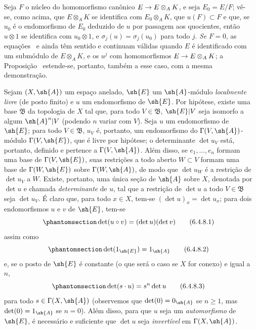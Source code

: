 \documentclass[oneside,10pt]{amsart}
\makeatletter
\renewcommand{\geq}{\geqslant}
\newcommand{\ega@arrow}[2]{\mathchoice{#1}{#2}{#2}{#2}}
\renewcommand{\to}{\ega@arrow{\longrightarrow}{\rightarrow}}
\let\EGAOriginalLabel\label
\renewcommand{\label}[1]{\phantomsection\EGAOriginalLabel{#1}}
\makeatother
\begin{document}
\begin{remark}[6.4.7]
Seja $F$ o núcleo do homomorfismo canônico $E\to E\otimes_A K$, e seja $E_0=E/F$;
vê-se, como acima, que $E\otimes_A K$ se identifica com $E_0\otimes_A K$, que $u(F)\subset F$ e que, se $u_0$ é o endomorfismo de $E_0$ deduzido de $u$ por passagem aos quocientes, então $u\otimes1$ se identifica com $u_0\otimes1$, e $\sigma_j(u)=\sigma_j(u_0)$ para todo $j$.
\emph{Se $F=0$}, as equações~ e  ainda têm sentido e continuam válidas quando $E$ é identificado com um submódulo de $E\otimes_A K$, e os $u^j$ com homomorfismos $E\to E\otimes_A K$;
a Proposição~ estende-se, portanto, também a esse caso, com a mesma demonstração.
\end{remark}

\begin{env}[6.4.8]
\label{II.6.4.8}
Sejam $(X,\sh{A})$ um espaço anelado, $\sh{E}$ um $\sh{A}$-módulo \emph{localmente livre} (de posto finito) e $u$ um endomorfismo de $\sh{E}$.
Por hipótese, existe uma base $\mathfrak{B}$ da topologia de $X$ tal que, para todo $V\in\mathfrak{B}$, $\sh{E}|V$ seja isomorfo a algum $\sh{A}^n|V$ (podendo $n$ variar com $V$).
Seja $u$ um endomorfismo de $\sh{E}$;
para todo $V\in\mathfrak{B}$, $u_V$ é, portanto, um endomorfismo do $\Gamma(V,\sh{A})$-módulo $\Gamma(V,\sh{E})$, que é livre por hipótese;
o determinante $\det u_V$ está, portanto, definido e pertence a $\Gamma(V,\sh{A})$.
Além disso, se $e_1,\ldots,e_n$ formam uma base de $\Gamma(V,\sh{E})$, suas restrições a todo aberto $W\subset V$ formam uma base de $\Gamma(W,\sh{E})$ sobre $\Gamma(W,\sh{A})$, de modo que $\det u_W$ é a restrição de $\det u_V$ a $W$.
Existe, portanto, uma única seção de $\sh{A}$ sobre $X$, denotada por $\det u$ e chamada \emph{determinante} de $u$, tal que a restrição de $\det u$ a todo $V\in\mathfrak{B}$ seja $\det u_V$.
É claro que, para todo $x\in X$, tem-se $(\det u)_x=\det u_x$;
para dois endomorfismos $u$ e $v$ de $\sh{E}$, tem-se
\[
\label{II.6.4.8.1}
  \det(u\circ v) = (\det u)(\det v)
\tag{6.4.8.1}
\]
assim como
\[
\label{II.6.4.8.2}
  \det(1_{\sh{E}}) = 1_{\sh{A}}
\tag{6.4.8.2}
\]
e, se o posto de $\sh{E}$ é constante (o que será o caso  se $X$ for conexo) e igual a $n$,
\[
\label{II.6.4.8.3}
  \det(s\cdot u) = s^n\det u
\tag{6.4.8.3}
\]
para todo $s\in\Gamma(X,\sh{A})$ (observemos que $\det(0)=0_{\sh{A}}$ se $n\geq1$, mas $\det(0)=1_{\sh{A}}$ se $n=0$).
Além disso, para que $u$ seja um \emph{automorfismo} de $\sh{E}$, é necessário e suficiente que $\det u$ seja \emph{invertível} em $\Gamma(X,\sh{A})$.


\end{env}
\end{document}
